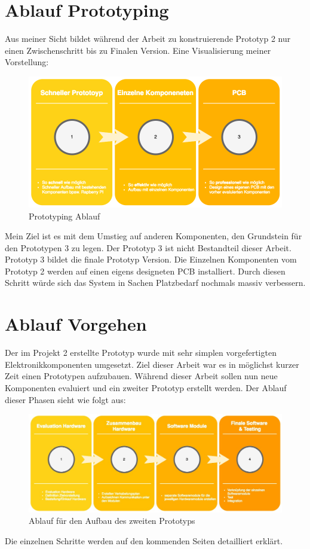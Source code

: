 \documentclass[11pt,english,german]{report}
\theoremstyle{definition}
\begin{document}
\section{Ablauf Prototyping}
Aus meiner Sicht bildet während der Arbeit zu konstruierende Prototyp 2 nur einen Zwischenschritt bis zu Finalen Version. Eine Visualisierung meiner Vorstellung:\\
\begin{figure}[H]
	\centering
	\includegraphics[width=\textwidth]{img/projectFlow_Prototype.png}
	\caption[Prototyping Ablauf]
	{Prototyping Ablauf}
\end{figure}
\noindent
Mein Ziel ist es mit dem Umstieg auf anderen Komponenten, den Grundstein für den Prototypen 3 zu legen. Der Prototyp 3 ist nicht Bestandteil dieser Arbeit. Prototyp 3 bildet die finale Prototyp Version. Die Einzelnen Komponenten vom Prototyp 2 werden auf einen eigens designeten PCB installiert. Durch diesen Schritt würde sich das System in Sachen Platzbedarf nochmals massiv verbessern.

\newpage
\section{Ablauf Vorgehen}
Der im Projekt 2 erstellte Prototyp wurde mit sehr simplen vorgefertigten Elektronikkomponenten umgesetzt. Ziel dieser Arbeit war es in möglichst kurzer Zeit einen Prototypen aufzubauen. Während dieser Arbeit sollen nun neue Komponenten evaluiert und ein zweiter Prototyp erstellt werden. Der Ablauf dieser Phasen sieht wie folgt aus:\\[0.3cm]

\begin{figure}[H]
	\centering
	\includegraphics[width=\textwidth]{img/projectFlow_hardware.jpg}
	\caption[Flowchart Prototyp 2]
	{Ablauf für den Aufbau des zweiten Prototyps}
\end{figure}
\noindent
Die einzelnen Schritte werden auf den kommenden Seiten detailliert erklärt.
\end{document}
